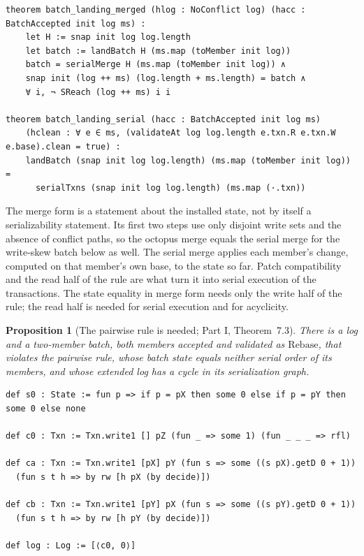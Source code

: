 \documentclass[11pt,letterpaper]{article}
\newtheorem{proposition}[theorem]{Proposition}
\theoremstyle{definition}
\theoremstyle{remark}
\newcommand{\Rb}{\mathrm{Rebase}}
\begin{document}
\begin{lstlisting}[language=Lean,caption={Batch landing in merge form, and for clean members (\texttt{YonedaTx/Soundness.lean})},label={lst:mcbl:soundmerged}]
theorem batch_landing_merged (hlog : NoConflict log) (hacc : BatchAccepted init log ms) :
    let H := snap init log log.length
    let batch := landBatch H (ms.map (toMember init log))
    batch = serialMerge H (ms.map (toMember init log)) ∧
    snap init (log ++ ms) (log.length + ms.length) = batch ∧
    ∀ i, ¬ SReach (log ++ ms) i i

theorem batch_landing_serial (hacc : BatchAccepted init log ms)
    (hclean : ∀ e ∈ ms, (validateAt log log.length e.txn.R e.txn.W e.base).clean = true) :
    landBatch (snap init log log.length) (ms.map (toMember init log)) =
      serialTxns (snap init log log.length) (ms.map (·.txn))
\end{lstlisting}

The merge form is a statement about the installed state, not by itself a serializability statement. Its first two steps use only disjoint write sets and the absence of conflict paths, so the octopus merge equals the serial merge for the write-skew batch below as well. The serial merge applies each member's change, computed on that member's own base, to the state so far. Patch compatibility and the read half of the rule are what turn it into serial execution of the transactions. The state equality in merge form needs only the write half of the rule; the read half is needed for serial execution and for acyclicity.

\begin{proposition}[The pairwise rule is needed; Part I, Theorem~7.3]
\label{prop:mcbl:ruleneeded}
There is a log and a two-member batch, both members accepted and validated as $\Rb$, that violates the pairwise rule, whose batch state equals neither serial order of its members, and whose extended log has a cycle in its serialization graph.
\end{proposition}

\begin{lstlisting}[language=Lean,caption={The write-skew history (\texttt{YonedaTx/Batch.lean})},label={lst:mcbl:skewdefs}]
def s0 : State := fun p => if p = pX then some 0 else if p = pY then some 0 else none

def c0 : Txn := Txn.write1 [] pZ (fun _ => some 1) (fun _ _ _ => rfl)

def ca : Txn := Txn.write1 [pX] pY (fun s => some ((s pX).getD 0 + 1))
  (fun s t h => by rw [h pX (by decide)])

def cb : Txn := Txn.write1 [pY] pX (fun s => some ((s pY).getD 0 + 1))
  (fun s t h => by rw [h pY (by decide)])

def log : Log := [⟨c0, 0⟩]
\end{lstlisting}
\end{document}
